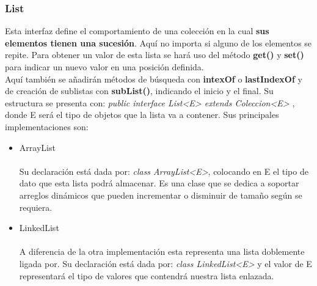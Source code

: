 \documentclass[12pt]{report}
\begin{document}
\subsubsection{List}
Esta interfaz define el comportamiento de una colección en la cual \textbf{sus elementos tienen una sucesión}. Aquí no importa si alguno de los elementos se repite. Para obtener un valor de esta lista se hará uso del método \textbf{get()} y \textbf{set()} para indicar un nuevo valor en una posición definida.\\ Aquí también se añadirán métodos de búsqueda con \textbf{intexOf} o \textbf{lastIndexOf} y de creación de sublistas con \textbf{subList()}, indicando el inicio y el final. Su estructura se presenta con: \textit{public interface List<E> extends Coleccion<E>} , donde E será el tipo de objetos que la lista va a contener.
Sus principales implementaciones son:
\begin{itemize}
    \item ArrayList\\ \\Su declaración está dada por: \textit{class ArrayList<E>}, colocando en E el tipo de dato que esta lista podrá almacenar. Es una clase que se dedica a soportar arreglos dinámicos que pueden incrementar o disminuir de tamaño según se requiera.
    \item LinkedList\\ \\ A diferencia de la otra implementación esta representa una lista doblemente ligada por. Su declaración está dada por: \textit{class LinkedList<E>} y el valor de E representará el tipo de valores que contendrá nuestra lista enlazada.
\end{itemize}
\end{document}
